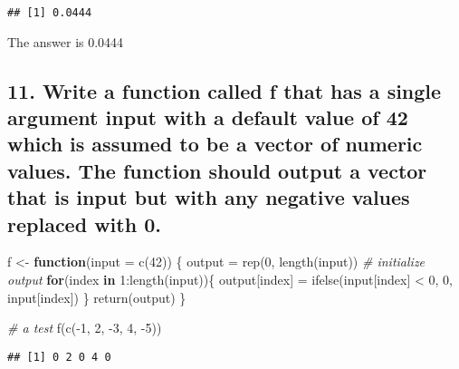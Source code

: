 \documentclass[
]{article}
\newenvironment{Shaded}{\begin{snugshade}}{\end{snugshade}}
\newcommand{\AttributeTok}[1]{\textcolor[rgb]{0.77,0.63,0.00}{#1}}
\newcommand{\CommentTok}[1]{\textcolor[rgb]{0.56,0.35,0.01}{\textit{#1}}}
\newcommand{\ControlFlowTok}[1]{\textcolor[rgb]{0.13,0.29,0.53}{\textbf{#1}}}
\newcommand{\DecValTok}[1]{\textcolor[rgb]{0.00,0.00,0.81}{#1}}
\newcommand{\FunctionTok}[1]{\textcolor[rgb]{0.00,0.00,0.00}{#1}}
\newcommand{\NormalTok}[1]{#1}
\newcommand{\OtherTok}[1]{\textcolor[rgb]{0.56,0.35,0.01}{#1}}
\newcommand{\SpecialCharTok}[1]{\textcolor[rgb]{0.00,0.00,0.00}{#1}}
\begin{document}
\begin{verbatim}
## [1] 0.0444
\end{verbatim}

The answer is 0.0444

\hypertarget{write-a-function-called-f-that-has-a-single-argument-input-with-a-default-value-of-42-which-is-assumed-to-be-a-vector-of-numeric-values.-the-function-should-output-a-vector-that-is-input-but-with-any-negative-values-replaced-with-0.}{%
\subsection{11. Write a function called f that has a single argument
input with a default value of 42 which is assumed to be a vector of
numeric values. The function should output a vector that is input but
with any negative values replaced with
0.}\label{write-a-function-called-f-that-has-a-single-argument-input-with-a-default-value-of-42-which-is-assumed-to-be-a-vector-of-numeric-values.-the-function-should-output-a-vector-that-is-input-but-with-any-negative-values-replaced-with-0.}}

\begin{Shaded}
\begin{Highlighting}[]
\NormalTok{f }\OtherTok{\textless{}{-}} \ControlFlowTok{function}\NormalTok{(}\AttributeTok{input =} \FunctionTok{c}\NormalTok{(}\DecValTok{42}\NormalTok{)) \{}
\NormalTok{  output }\OtherTok{=} \FunctionTok{rep}\NormalTok{(}\DecValTok{0}\NormalTok{, }\FunctionTok{length}\NormalTok{(input)) }\CommentTok{\# initialize output}
  \ControlFlowTok{for}\NormalTok{(index }\ControlFlowTok{in} \DecValTok{1}\SpecialCharTok{:}\FunctionTok{length}\NormalTok{(input))\{}
\NormalTok{    output[index] }\OtherTok{=} \FunctionTok{ifelse}\NormalTok{(input[index] }\SpecialCharTok{\textless{}} \DecValTok{0}\NormalTok{, }\DecValTok{0}\NormalTok{, input[index])}
\NormalTok{  \}}
  \FunctionTok{return}\NormalTok{(output)}
\NormalTok{\}}

\CommentTok{\# a test}
\FunctionTok{f}\NormalTok{(}\FunctionTok{c}\NormalTok{(}\SpecialCharTok{{-}}\DecValTok{1}\NormalTok{, }\DecValTok{2}\NormalTok{, }\SpecialCharTok{{-}}\DecValTok{3}\NormalTok{, }\DecValTok{4}\NormalTok{, }\SpecialCharTok{{-}}\DecValTok{5}\NormalTok{))}
\end{Highlighting}
\end{Shaded}

\begin{verbatim}
## [1] 0 2 0 4 0
\end{verbatim}
\end{document}
